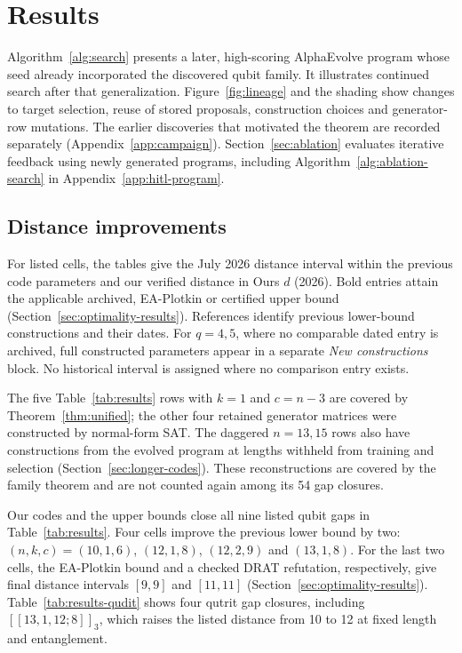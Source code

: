 \documentclass{article}
\begin{document}
\FloatBarrier
\section{Results}\label{sec:results}

Algorithm~\ref{alg:search} presents a later, high-scoring AlphaEvolve
program whose seed already incorporated the discovered qubit family.
It illustrates continued search after that generalization.
Figure~\ref{fig:lineage} and the shading show changes to target selection,
reuse of stored proposals, construction choices and generator-row
mutations. The earlier discoveries that motivated the theorem are
recorded separately (Appendix~\ref{app:campaign}). Section~\ref{sec:ablation}
evaluates iterative feedback using newly generated programs, including
Algorithm~\ref{alg:ablation-search} in Appendix~\ref{app:hitl-program}.




\subsection{Distance improvements}\label{sec:distance-results}

For listed cells, the tables give the July 2026 distance interval within
the previous code parameters and our verified distance in Ours $d$
(2026). Bold entries attain the applicable archived, EA-Plotkin or
certified upper bound (Section~\ref{sec:optimality-results}). References
identify previous lower-bound constructions and their dates. For
$q=4,5$, where no comparable dated entry is archived, full constructed
parameters appear in a separate \emph{New constructions} block.
No historical interval is assigned where no comparison entry exists.



The five Table~\ref{tab:results} rows with $k=1$ and $c=n-3$ are
covered by Theorem~\ref{thm:unified}; the other four retained generator
matrices were constructed by normal-form SAT. The daggered $n=13,15$
rows also have constructions from the evolved program at lengths withheld
from training and selection (Section~\ref{sec:longer-codes}). These
reconstructions are covered by the family theorem and are not counted
again among its 54 gap closures.

Our codes and the upper bounds close all nine listed qubit gaps in
Table~\ref{tab:results}. Four cells improve the previous lower bound by
two: $(n,k,c)=(10,1,6)$, $(12,1,8)$, $(12,2,9)$ and $(13,1,8)$.
For the last two cells, the EA-Plotkin bound and a checked DRAT refutation,
respectively, give final distance intervals $[9,9]$ and $[11,11]$
(Section~\ref{sec:optimality-results}). Table~\ref{tab:results-qudit}
shows four qutrit gap closures, including $[[13,1,12;8]]_3$, which raises
the listed distance from 10 to 12 at fixed length and entanglement.
\end{document}
